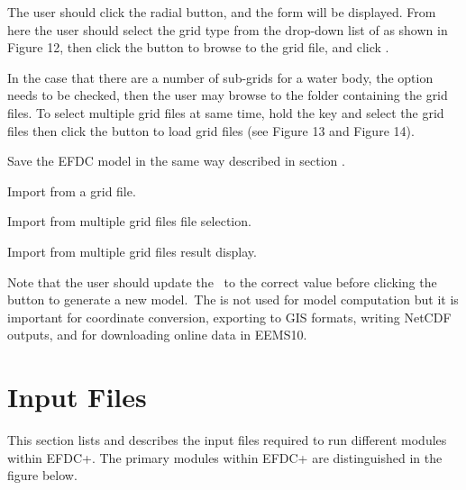 \documentclass[letterpaper,10pt,english]{sphinxmanual}
\begin{document}
The user should click the  radial button, and the  form will be displayed. From here the user should select the grid
type from the drop-down list of  as shown in Figure 12, then
click the  button to browse to the grid file, and click .

In the case that there are a number of sub-grids for a water body, the
 option needs to be checked, then the user may
browse to the folder containing the grid files. To select multiple grid
files at same time, hold the  key and select the grid files then
click the  button to load grid files (see Figure 13 and Figure 14).

Save the EFDC model in the same way described in section {\hyperref[\detokenize{gridgen/uniformgrid:uniformgrid}]{}}.


 Import from a grid file.


 Import from multiple grid files \textendash{} file selection.


 Import from multiple grid files \textendash{} result display.

Note that the user should update the  to the correct value
before clicking the  button to generate a new model. The 
is not used for model computation but it is important for coordinate
conversion, exporting to GIS formats, writing NetCDF outputs, and for
downloading online data in EEMS10.


\section{Input Files}
\label{\detokenize{inputfiles/index:input-files}}\label{\detokenize{inputfiles/index:inputfiles}}\label{\detokenize{inputfiles/index::doc}}
This section lists and describes the input files required to run different modules within EFDC+. The primary modules within EFDC+ are distinguished in the figure below.
\end{document}
